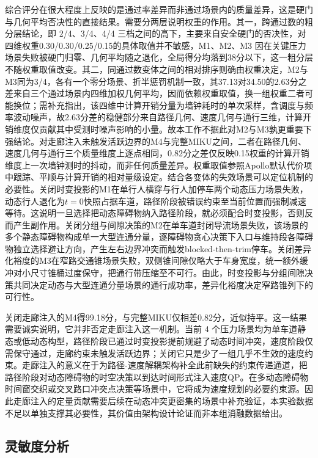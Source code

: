 \documentclass[a4paper,11pt]{ctexart}
\theoremstyle{definition}
\begin{document}
综合评分在很大程度上反映的是通过率差异而非通过场景内的质量差异，这是硬门与几何平均否决性的直接结果。需要分两层说明权重的作用。其一，跨通过数的粗分层结论，即 2/4、3/4、4/4 三档之间的高下，主要来自安全硬门的否决性，对四维权重0.30/0.30/0.25/0.15的具体取值并不敏感，M1、M2、M3 因在关键压力场景失败被硬门归零、几何平均随之退化，全局得分均落到38分以下，这一粗分层不随权重取值改变。其二，同通过数变体之间的相对排序则确由权重决定，M2与M3同为3/4，各有一个零分场景、折半惩罚机制一致，其37.13对34.50的2.63分之差来自三个通过场景内四维加权几何平均，因而依赖权重取值，换一组权重二者可能换位；需补充指出，该四维中计算开销分量为墙钟耗时的单次采样，含调度与频率波动噪声，故2.63分差的稳健部分来自路径几何、速度几何与通行三维，计算开销维度仅贡献其中受测时噪声影响的小量。故本工作不据此对M2与M3孰更重要下强结论。对走廊注入未触发活跃边界的M4与完整MIKU之间，二者在路径几何、速度几何与通行三个质量维度上逐点相同，0.82分之差仅反映0.15权重的计算开销维度上一次墙钟测时的抖动，而非任何质量差异。权重取值参照Apollo默认代价项中跟踪、平顺与计算开销的相对量级设定。结合各变体的失效场景可以定位机制的必要性。关闭时变投影的M1在单行人横穿与行人加停车两个动态压力场景失败，动态行人退化为$t=0$快照占据车道，路径阶段被错误约束至当前位置而强制减速等待。这说明一旦选择把动态障碍物纳入路径阶段，就必须配合时变投影，否则反而产生副作用。关闭分组与间隙决策的M2在单车道封闭导流场景失败，该场景的多个静态障碍物构成单一大型连通分量，逐障碍物贪心决策下入口与维持段各障碍物独立选择避让方向，产生左右边界冲突而触发blocked-then-trim停车。关闭差异化裕度的M3在窄路交通锥场景失败，双侧锥间隙仅略大于车身宽度，统一额外缓冲对小尺寸锥桶过度保守，把通行带压缩至不可行。由此，时变投影与分组间隙决策共同决定动态与大型连通分量场景的通行成功率，差异化裕度决定窄路锥列下的可行性。

关闭走廊注入的M4得99.18分，与完整MIKU仅相差0.82分，近似持平。这一结果需要诚实说明，它并非否定走廊注入这一机制。当前 4 个压力场景均为单车道静态或低动态构型，路径阶段已通过时变投影提前规避了动态时间冲突，速度阶段仅需保守通过，走廊约束未触发活跃边界；关闭它只是少了一组几乎不生效的速度约束。走廊注入的意义在于为路径-速度解耦架构补全此前缺失的约束传递通道，把路径阶段对动态障碍物的时空决策以到达时间形式注入速度QP。在多动态障碍物时间窗交织或交叉路口冲突点决策等场景中，它将成为速度规划的必要约束源。因此走廊注入的定量贡献需要后续在动态冲突更密集的场景中补充验证，本实验数据不足以单独支撑其必要性，其价值由架构设计论证而非本组消融数据给出。

\subsection{灵敏度分析}
\label{subsec:exp_sensitivity}
\end{document}
